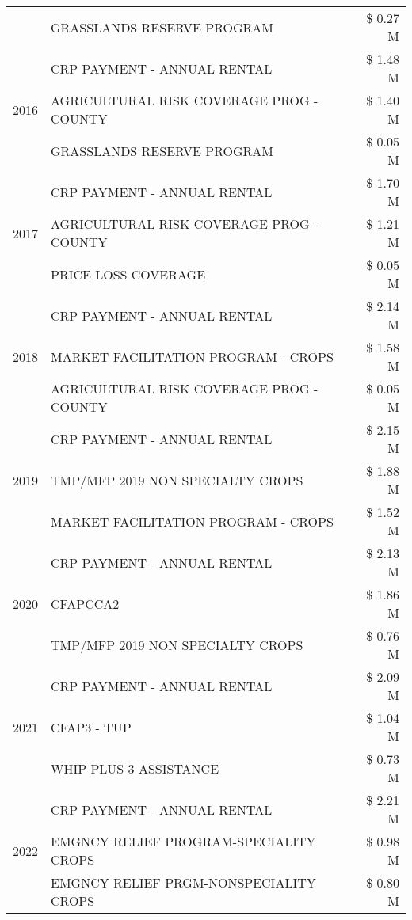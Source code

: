 \begin{tabular}{llr}
 & GRASSLANDS RESERVE PROGRAM & \$ 0.27 M \\
\cline{1-3}
\multirow[t]{3}{*}{2016} & CRP PAYMENT - ANNUAL RENTAL & \$ 1.48 M \\
 & AGRICULTURAL RISK COVERAGE PROG - COUNTY & \$ 1.40 M \\
 & GRASSLANDS RESERVE PROGRAM & \$ 0.05 M \\
\cline{1-3}
\multirow[t]{3}{*}{2017} & CRP PAYMENT - ANNUAL RENTAL & \$ 1.70 M \\
 & AGRICULTURAL RISK COVERAGE PROG - COUNTY & \$ 1.21 M \\
 & PRICE LOSS COVERAGE & \$ 0.05 M \\
\cline{1-3}
\multirow[t]{3}{*}{2018} & CRP PAYMENT - ANNUAL RENTAL & \$ 2.14 M \\
 & MARKET FACILITATION PROGRAM - CROPS & \$ 1.58 M \\
 & AGRICULTURAL RISK COVERAGE PROG - COUNTY & \$ 0.05 M \\
\cline{1-3}
\multirow[t]{3}{*}{2019} & CRP PAYMENT - ANNUAL RENTAL & \$ 2.15 M \\
 & TMP/MFP 2019 NON SPECIALTY CROPS & \$ 1.88 M \\
 & MARKET FACILITATION PROGRAM - CROPS & \$ 1.52 M \\
\cline{1-3}
\multirow[t]{3}{*}{2020} & CRP PAYMENT - ANNUAL RENTAL & \$ 2.13 M \\
 & CFAPCCA2 & \$ 1.86 M \\
 & TMP/MFP 2019 NON SPECIALTY CROPS & \$ 0.76 M \\
\cline{1-3}
\multirow[t]{3}{*}{2021} & CRP PAYMENT - ANNUAL RENTAL & \$ 2.09 M \\
 & CFAP3 - TUP & \$ 1.04 M \\
 & WHIP PLUS 3 ASSISTANCE & \$ 0.73 M \\
\cline{1-3}
\multirow[t]{3}{*}{2022} & CRP PAYMENT - ANNUAL RENTAL & \$ 2.21 M \\
 & EMGNCY RELIEF PROGRAM-SPECIALITY CROPS & \$ 0.98 M \\
 & EMGNCY RELIEF PRGM-NONSPECIALITY CROPS & \$ 0.80 M \\
\cline{1-3}
\bottomrule
\end{tabular}
